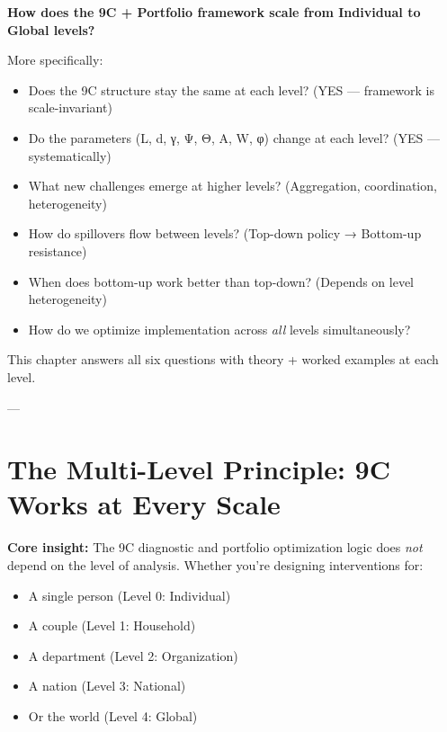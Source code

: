 \begin{tcolorbox}[colback=red!5!white, colframe=red!75!black, title=Central Question of This Chapter]

\textbf{How does the 9C + Portfolio framework scale from Individual to Global levels?}

\vspace{0.3cm}

More specifically:
\begin{itemize}
\item Does the 9C structure stay the same at each level? (YES --- framework is scale-invariant)
\item Do the parameters (L, d, γ, Ψ, Θ, A, W, φ) change at each level? (YES --- systematically)
\item What new challenges emerge at higher levels? (Aggregation, coordination, heterogeneity)
\item How do spillovers flow between levels? (Top-down policy → Bottom-up resistance)
\item When does bottom-up work better than top-down? (Depends on level heterogeneity)
\item How do we optimize implementation across \emph{all} levels simultaneously?
\end{itemize}

This chapter answers all six questions with theory + worked examples at each level.

\end{tcolorbox}

---


\section{The Multi-Level Principle: 9C Works at Every Scale}
\label{sec:scale-invariance}

\textbf{Core insight:} The 9C diagnostic and portfolio optimization logic does \emph{not} depend on the level of analysis. Whether you're designing interventions for:

\begin{itemize}
\item A single person (Level 0: Individual)
\item A couple (Level 1: Household)
\item A department (Level 2: Organization)
\item A nation (Level 3: National)
\item Or the world (Level 4: Global)
\end{itemize}

